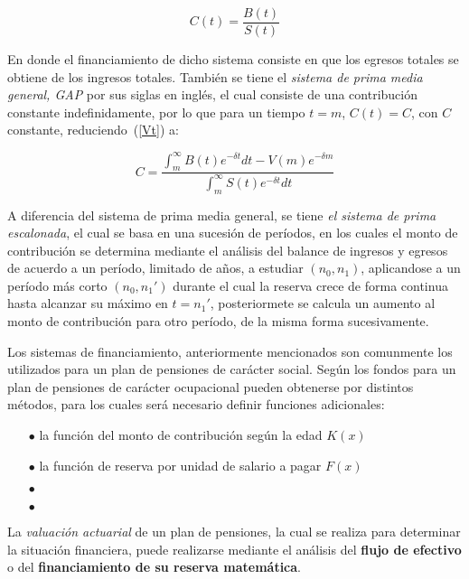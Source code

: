 \documentclass[12pt,letterpaper,titlepage]{article}
\begin{document}
\begin{equation}\label{payg}
C(t)=\frac{B(t)}{S(t)}
\end{equation}

En donde el financiamiento de dicho sistema consiste en que los egresos totales se obtiene de los ingresos totales. También se tiene el \textit{sistema de prima media general, GAP} por sus siglas en inglés, el cual consiste de una contribución constante indefinidamente, por lo que para un tiempo $t=m$, $C(t)=C$, con $C$ constante, reduciendo~(\ref{Vt}) a:

\begin{equation}\label{gap}
C=\dfrac{\int_{m}^{\infty}B(t)e^{-\delta t}dt-V(m)e^{-\delta m}}{\int^{\infty}_{m}S(t)e^{-\delta t}dt}
\end{equation}

A diferencia del sistema de prima media general, se tiene \textit{el sistema de prima escalonada}, el cual se basa en una sucesión de períodos, en los cuales el monto de contribución se determina mediante el análisis del balance de ingresos y egresos de acuerdo a un período, limitado de años, a estudiar $(n_{0}, n_{1})$, aplicandose a un período más corto $(n_{0}, n_{1}')$ durante el cual la reserva crece de forma continua hasta alcanzar su máximo en $t=n_{1}'$, posteriormete se calcula un aumento al monto de contribución para otro período, de la misma forma sucesivamente.

Los sistemas de financiamiento, anteriormente mencionados son comunmente los utilizados para un plan de pensiones de carácter social. Según \cite{778} los fondos para un plan de pensiones de carácter ocupacional pueden obtenerse por distintos métodos, para los cuales será necesario definir funciones adicionales:

\begin{itemize}
	\item [$\bullet$] la función del monto de contribución según la edad $K(x)$
	\item [$\bullet$] la función de reserva por unidad de salario a pagar $F(x)$
	\item [$\bullet$]
	\item [$\bullet$]
\end{itemize}

La \textit{valuación actuarial} de un plan de pensiones, la cual se realiza para determinar la situación financiera, puede realizarse mediante el análisis del \textbf{flujo de efectivo} o del \textbf{financiamiento de su reserva matemática}.
\end{document}
